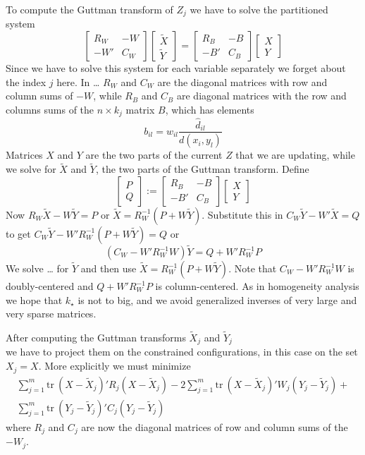 \documentclass[
  12pt,
]{article}
\begin{document}
To compute the Guttman transform of \(Z_j\) we have to solve
the partitioned system
\[
\begin{bmatrix}
R_W&-W\\
-W'&C_W
\end{bmatrix}
\begin{bmatrix}\tilde X\\\tilde Y\end{bmatrix}=
\begin{bmatrix}
R_B&-B\\
-B'&C_B
\end{bmatrix}
\begin{bmatrix}X\\Y\end{bmatrix}
\]
Since we have to solve this system for each variable separately we forget about the index \(j\) here. In \ldots{} \(R_W\) and \(C_W\) are the diagonal matrices with row and column sums of \(-W\), while \(R_B\) and \(C_B\) are diagonal matrices with the row and columns sums of the \(n\times k_j\) matrix \(B\), which has elements
\[
b_{il}=w_{il}\frac{\hat d_{il}}{d(x_i,y_l)}
\]
Matrices \(X\) and \(Y\) are the two parts of the current \(Z\) that we are updating,
while we solve for \(\tilde X\) and \(\tilde Y\), the two parts of the Guttman
transform. Define
\[
\begin{bmatrix}
P\\Q
\end{bmatrix}:=
\begin{bmatrix}
R_B&-B\\
-B'&C_B
\end{bmatrix}
\begin{bmatrix}X\\Y\end{bmatrix}
\]
Now
\(R_W\tilde X-W\tilde Y=P\) or \(\tilde X=R_W^{-1}(P+W\tilde Y)\). Substitute this in \(C_W\tilde Y-W'\tilde X=Q\)
to get \(C_W\tilde Y-W'R_W^{-1}(P+W\tilde Y)=Q\) or
\[
(C_W-W'R_W^{-1}W)\tilde Y=Q+W'R_W^{-1}P
\]
We solve \ldots{} for \(\tilde Y\) and then use \(\tilde X=R_W^{-1}(P+W\tilde Y)\).
Note that \(C_W-W'R_W^{-1}W\) is doubly-centered and \(Q+W'R_W^{-1}P\) is column-centered. As in homogeneity analysis we hope that \(k_\star\)
is not to big, and we avoid generalized inverses of very large and very
sparse matrices.

After computing the Guttman transforms \(\tilde X_j\) and \(\tilde Y_j\)\\
we have to project them on the constrained configurations, in this
case on the set \(X_j=X\). More explicitly we must minimize
\begin{multline}
\sum_{j=1}^m\text{tr}\ (X-\tilde X_j)'R_j(X-\tilde X_j)-2\sum_{j=1}^m\text{tr}\ (X-\tilde X_j)'W_j(Y_j-\tilde Y_j)+\\
\sum_{j=1}^m\text{tr}\ (Y_j-\tilde Y_j)'C_j(Y_j-\tilde Y_j)
\end{multline}
where \(R_j\) and \(C_j\) are now the diagonal matrices of row and column sums of the
\(-W_j\).
\end{document}
